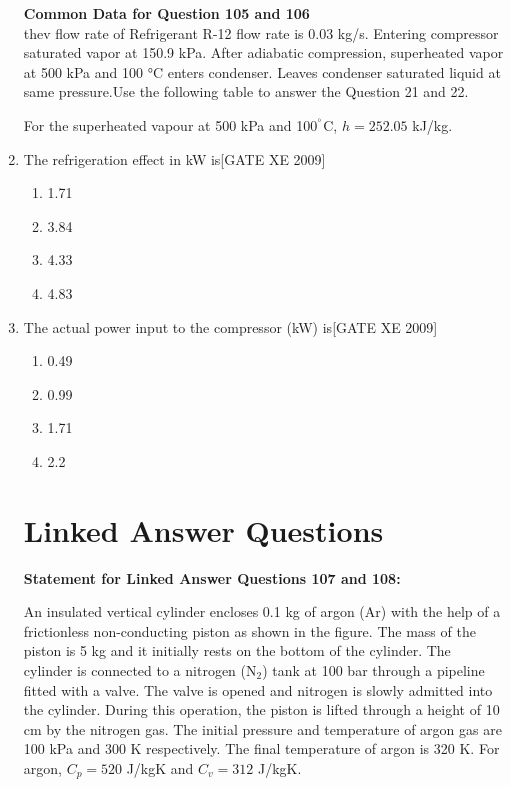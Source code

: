 \documentclass[journal,12pt,onecolumn]{IEEEtran}
\theoremstyle{remark}
\begin{document}
\begin{enumerate}
\textbf{Common Data for Question 105 and 106}\\ thev flow rate of Refrigerant R-12 flow rate is 0.03 kg/s. Entering compressor saturated vapor at 150.9 kPa. After adiabatic compression, superheated vapor at 500 kPa and 100 °C enters condenser. Leaves condenser saturated liquid at same pressure.Use the following table to answer the Question 21 and 22.


\noindent
For the superheated vapour at 500 kPa and 100$^\degree$C, $h = 252.05$ kJ/kg.

\item The refrigeration effect in kW is\hfill[GATE XE 2009]
\begin{multicols}{2}
\begin{enumerate}
    \item 1.71
    \item 3.84
    \item 4.33
    \item 4.83
\end{enumerate}
\end{multicols}



\item The actual power input to the compressor (kW) is\hfill[GATE XE 2009]
\begin{multicols}{2}
\begin{enumerate}
    \item 0.49
    \item 0.99
    \item 1.71
    \item 2.2
\end{enumerate}
\end{multicols}


\section*{Linked Answer Questions}

\textbf{Statement for Linked Answer Questions 107 and 108:}

An insulated vertical cylinder encloses 0.1 kg of argon (Ar) with the help of a frictionless non-conducting piston as shown in the figure. The mass of the piston is 5 kg and it initially rests on the bottom of the cylinder. The cylinder is connected to a nitrogen (N$_2$) tank at 100 bar through a pipeline fitted with a valve. The valve is opened and nitrogen is slowly admitted into the cylinder. During this operation, the piston is lifted through a height of 10 cm by the nitrogen gas. The initial pressure and temperature of argon gas are 100 kPa and 300 K respectively. The final temperature of argon is 320 K. For argon, $C_p = 520$ J/kgK and $C_v = 312$ J/kgK.



\end{enumerate}
\end{document}
